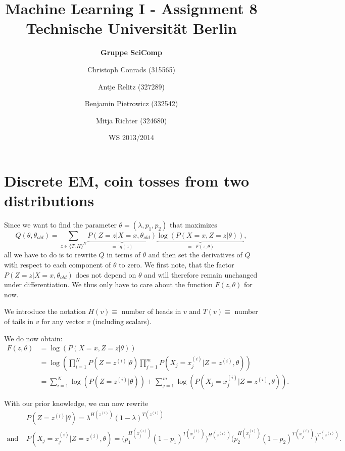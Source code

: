 \documentclass[paper=a4,fontsize=10pt,DIV11,BCOR10mm]{scrartcl}
\begin{document}
\title{Machine Learning I - Assignment 8\\
\small{Technische Universität Berlin}}


\author{\hspace{5cm}\textbf{Gruppe SciComp}\hspace{5cm} \and
	\small{Christoph Conrads (315565)} \and
	\small{Antje Relitz (327289)} \and
	\small{Benjamin Pietrowicz (332542)} \and
	\small{Mitja Richter (324680)}
}

\date{WS 2013/2014}

\maketitle


\section{Discrete EM, coin tosses from two distributions}

Since we want to find the parameter $\theta=(\lambda,p_1,p_2)$ that maximizes \begin{equation*}
Q(\theta,\theta_{old})=\sum_{z\in \{T,H\}^N}\underbrace{P(Z=z|X=x,\theta_{old})}_{=:q(z)}  \underbrace{\log(P(X=x,Z=z|\theta))}_{=:F(z,\theta)},
\end{equation*}
all we have to do is to rewrite $Q$ in terms of $\theta$ and then set the derivatives of $Q$ with respect to each component of $\theta$ to zero. We first note, that the factor $P(Z=z|X=x,\theta_{old})$ does not depend on $\theta$ and will therefore remain unchanged under differentiation. We thus only have to care about the function $F(z,\theta)$ for now.

We introduce the notation $H(v)\equiv$ number of heads in $v$ and $T(v)\equiv$ number of tails in $v$ for any vector $v$ (including scalars).

We do now obtain:
\begin{align*}
F(z,\theta)&=\log(P(X=x,Z=z|\theta))\\
&=\log( \prod_{i=1}^N P(Z=z^{(i)}|\theta) \prod_{j=1}^m P(X_j=x_j^{(i)}|Z=z^{(i)},\theta)) \\
&=\sum_{i=1}^N \log (P(Z=z^{(i)}|\theta)) + \sum_{j=1}^m \log (P(X_j=x_j^{(i)}|Z=z^{(i)},\theta)).
\end{align*}

With our prior knowledge, we can now rewrite
\begin{align*}
&P(Z=z^{(i)}|\theta)=\lambda^{H(z^{(i)})}(1-\lambda)^{T(z^{(i)})}\\
\text{and } & P(X_j=x_j^{(i)}|Z=z^{(i)},\theta)= \bigl( p_1^{H(x_j^{(i)})} (1-p_1)^{T(x_j^{(i)})}\bigr)^{H(z^{(i)})} \bigl(  p_2^{H(x_j^{(i)})} (1-p_2)^{T(x_j^{(i)})} \bigr)^{T(z^{(i)})}.
\end{align*}
\end{document}
